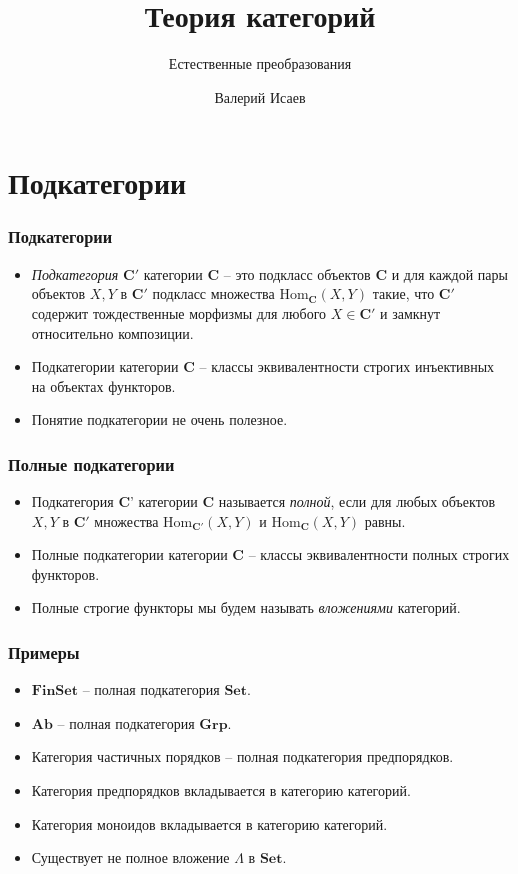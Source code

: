 \documentclass{beamer}
\theoremstyle{definition}
\newcommand{\cat}[1]{\mathbf{#1}}
\renewcommand{\C}{\cat{C}}
\newcommand{\Set}{\cat{Set}}
\newcommand{\FinSet}{\cat{FinSet}}
\newcommand{\Grp}{\cat{Grp}}
\newcommand{\Ab}{\cat{Ab}}
\newcommand{\fs}[1]{\mathrm{#1}}
\newcommand{\Hom}{\fs{Hom}}
\begin{document}
\title{Теория категорий}
\subtitle{Естественные преобразования}
\author{Валерий Исаев}
\maketitle

\section{Подкатегории}

\begin{frame}
\frametitle{Подкатегории}
\begin{itemize}
\item \emph{Подкатегория} $\C'$ категории $\C$ -- это подкласс объектов $\C$ и для каждой пары объектов $X,Y$ в $\C'$ подкласс множества $\Hom_\C(X,Y)$ такие, что $\C'$ содержит тождественные морфизмы для любого $X \in \C'$ и замкнут относительно композиции.
\item Подкатегории категории $\C$ -- классы эквивалентности строгих инъективных на объектах функторов.
\item Понятие подкатегории не очень полезное.
\end{itemize}
\end{frame}

\begin{frame}
\frametitle{Полные подкатегории}
\begin{itemize}
\item Подкатегория $\C$' категории $\C$ называется \emph{полной}, если для любых объектов $X,Y$ в $\C'$ множества $\Hom_{\C'}(X,Y)$ и $\Hom_\C(X,Y)$ равны.
\item Полные подкатегории категории $\C$ -- классы эквивалентности полных строгих функторов.
\item Полные строгие функторы мы будем называть \emph{вложениями} категорий.
\end{itemize}
\end{frame}

\begin{frame}
\frametitle{Примеры}
\begin{itemize}
\item $\FinSet$ -- полная подкатегория $\Set$.
\item $\Ab$ -- полная подкатегория $\Grp$.
\item Категория частичных порядков -- полная подкатегория предпорядков.
\item Категория предпорядков вкладывается в категорию категорий.
\item Категория моноидов вкладывается в категорию категорий.
\item Существует не полное вложение $\Lambda$ в $\Set$.
\end{itemize}
\end{frame}
\end{document}
